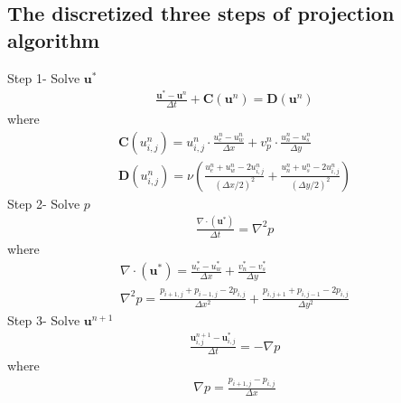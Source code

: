 \documentclass[11pt,dvips]{article}
\numberwithin{equation}{section}
\begin{document}
\subsection{The discretized three steps of projection algorithm}
Step 1- Solve $\mathbf{u}^{*}$
\begin{align*}
\frac{\mathbf{u}^{*}-\mathbf{u}^{n}}{\Delta t}+\mathbf{C}(\mathbf{u}^{n})=\mathbf{D}(\mathbf{u}^{{n}}) 
\label{6a}
\end{align*}
where
\begin{align*}
\mathbf{C}(u^n_{i,j})=u^n_{i,j} \cdot \frac{u^n_{e}-u^n_{w}}{\Delta x}+v^n_{p} \cdot \frac{u^n_{n}-u^n_{s}}{\Delta y} \\
\mathbf{D}(u^n_{i,j})=\nu (\frac{u^n_{e}+ u^n_{w}-2u^n_{i,j}}{(\Delta x/2)^2}+\frac{u^n_{n}+ u^n_{s}-2u^n_{i,j}}{(\Delta y/2)^2})
\end{align*}
Step 2- Solve $p$
\begin{align*}
\frac{\nabla \cdot(\mathbf{u}^{*})}{\Delta t}=\nabla ^2 p
\label{9}
\end{align*}
where
\begin{align*}
\nabla \cdot(\mathbf{u}^{*})=\frac{u^{*}_{e}-u^{*}_{w}}{\Delta x}+\frac{v^{*}_{n}-v^{*}_{s}}{\Delta y} \\
\nabla ^2 p=\frac{p_{i+1,j}+p_{i-1,j}-2p_{i,j}}{\Delta x^2}+\frac{p_{i,j+1}+p_{i,j-1}-2p_{i,j}}{\Delta y^2}
\end{align*}
Step 3- Solve $\mathbf{u}^{n+1}$
\begin{align*}
\frac{\mathbf{u}^{n+1}_{i,j}-\mathbf{u}^{*}_{i,j}}{\Delta t}=-\nabla p
\label{6b}
\end{align*}
where
\begin{align*}
\nabla p=\frac{p_{i+1,j}-p_{i,j}}{\Delta x}
\end{align*}

\clearpage


\end{document}
